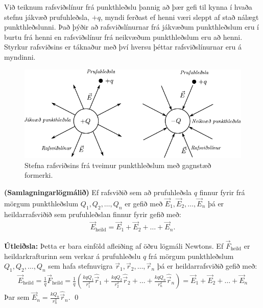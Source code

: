 \ifdefined \wholebook \else\documentclass[oneside]{book}\usepackage{EdlBook}\graphicspath{{figures/}}
\begin{document}
\begin{tcolorbox}
Við teiknum rafsviðslínur frá punkthleðslu þannig að þær gefi til kynna í hvaða stefnu jákvæð prufuhleðsla, $+q$, myndi ferðast ef henni væri sleppt af stað nálægt punkthleðslunni. Það þýðir að rafsviðslínurnar frá jákvæðum punkthleðslum eru í burtu frá henni en rafsviðslínur frá neikvæðum punkthleðslum eru að henni. Styrkur rafsviðsins er táknaður með því hversu þéttar rafsviðslínurnar eru á myndinni.
\begin{figure}[H]
    \centering
    \includegraphics{prufuhledslur.pdf}
    \caption{Stefna rafsviðsins frá tveimur punkthleðslum með gagnstæð formerki.}
\end{figure}
\end{tcolorbox}

\begin{tcolorbox}
\begin{theorem}
\textbf{(Samlagningarlögmálið)} Ef rafsviðið sem að prufuhleðsla $q$ finnur fyrir frá mörgum punkthleðslum $Q_1, Q_2, \ldots, Q_n$ er gefið með $\vec{E}_1, \vec{E}_2, \ldots, \vec{E}_n$ þá er heildarrafsviðið sem prufuhleðslan finnur fyrir gefið með:
\begin{align*}
    \vec{E}_{\text{heild}} = \vec{E}_1 + \vec{E}_2 + \ldots + \vec{E}_n.
\end{align*}
\end{theorem}
\end{tcolorbox}

\textbf{Útleiðsla:} Þetta er bara einföld afleiðing af öðru lögmáli Newtons. Ef $\vec{F}_{\text{heild}}$ er heildarkrafturinn sem verkar á prufuhleðslu $q$ frá mörgum punkthleðslum $Q_1, Q_2, \ldots, Q_n$ sem hafa stefnuvigra $\vec{r}_1, \vec{r}_2, \ldots, \vec{r}_n$ þá er heildarrafsviðið gefið með:
\begin{align*}
    \vec{E}_{\text{heild}} = \frac{1}{q} \vec{F}_{\text{heild}} = \frac{1}{q}\left( \frac{kqQ_1}{r_1^2} \hat{\vec{r}}_1 + \frac{kqQ_2}{r_2^2} \hat{\vec{r}}_2 + \ldots + \frac{kqQ_n}{r_n^2} \hat{\vec{r}}_n \right) = \vec{E}_1 + \vec{E}_2 + \ldots + \vec{E}_n
\end{align*}
Þar sem $\vec{E}_n = \frac{kQ_n}{r_n^2} \hat{\vec{r}}_n$. \qed
\end{document}
